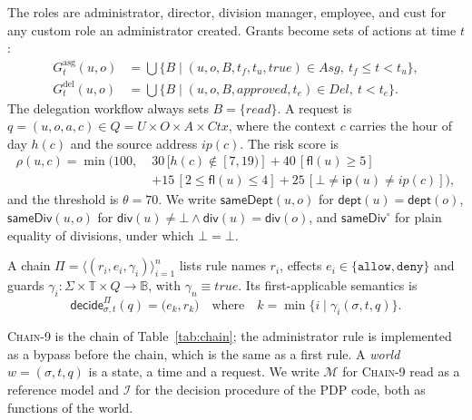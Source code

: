 \documentclass[sigconf,review,anonymous]{acmart}
\newcommand{\chain}{\textsc{Chain-9}\xspace}
\newcommand{\Gasg}{G^{\mathrm{asg}}}
\newcommand{\Gdel}{G^{\mathrm{del}}}
\newcommand{\sameDept}{\mathsf{sameDept}}
\newcommand{\sameDiv}{\mathsf{sameDiv}}
\newcommand{\decide}{\mathsf{decide}}
\newcommand{\allowv}{\mathtt{allow}}
\newcommand{\denyv}{\mathtt{deny}}
\begin{document}
The roles are administrator, director, division manager, employee, and $\mathrm{cust}$ for any custom role an
administrator created. Grants become sets of actions at time $t$:
\begin{align*}
\Gasg_t(u,o) &= \textstyle\bigcup\{B \mid (u,o,B,t_f,t_u,\mathit{true})\in\mathit{Asg},\ t_f\le t<t_u\},\\
\Gdel_t(u,o) &= \textstyle\bigcup\{B \mid (u,o,B,\mathit{approved},t_e)\in\mathit{Del},\ t<t_e\}.
\end{align*}
The delegation workflow always sets $B=\{\mathit{read}\}$. A request is $q=(u,o,a,c)\in Q=U\times O\times A\times
\mathit{Ctx}$, where the context $c$ carries the hour of day $h(c)$ and the source address $\mathit{ip}(c)$. The
risk score is
\begin{align*}
\rho(u,c)=\min\bigl(100,\;&30\,[h(c)\notin[7,19)]+40\,[\mathsf{fl}(u)\ge5]\\
&+15\,[2\le\mathsf{fl}(u)\le4]+25\,[\bot\neq\mathsf{ip}(u)\neq\mathit{ip}(c)]\bigr),
\end{align*}
and the threshold is $\theta=70$. We write $\sameDept(u,o)$ for $\mathsf{dept}(u)=\mathsf{dept}(o)$, $\sameDiv(u,o)$
for $\mathsf{div}(u)\neq\bot\wedge\mathsf{div}(u)=\mathsf{div}(o)$, and $\sameDiv^\circ$ for plain equality of
divisions, under which $\bot=\bot$.

\begin{definition}\label{def:chain}
A chain $\Pi=\langle(r_i,e_i,\gamma_i)\rangle_{i=1}^{n}$ lists rule names $r_i$, effects
$e_i\in\{\allowv,\denyv\}$ and guards $\gamma_i:\Sigma\times\mathbb{T}\times Q\to\mathbb{B}$, with
$\gamma_n\equiv\mathit{true}$. Its first-applicable semantics is
\[
\decide^\Pi_{\sigma,t}(q)=\bigl(e_k,r_k\bigr)\quad\text{where}\quad k=\min\{i\mid\gamma_i(\sigma,t,q)\}.
\]
\end{definition}

\chain is the chain of Table~\ref{tab:chain}; the administrator rule is implemented as a bypass before the chain,
which is the same as a first rule. A \emph{world} $w=(\sigma,t,q)$ is a state, a time and a request. We write
$\mathcal{M}$ for \chain read as a reference model and $\mathcal{I}$ for the decision procedure of the PDP code,
both as functions of the world.
\end{document}
